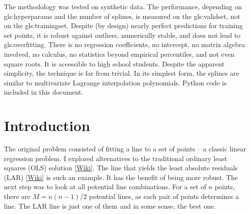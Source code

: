 \documentclass[oneside,10pt]{book}
\begin{document}
The methodology was tested on synthetic data. The performance, depending on \glspl{gls:hyperparam} and the number of splines, is measured on the \gls{gls:validset}, not on the \gls{gls:trainingset}. Despite (by design) nearly perfect predictions for training set points, it is robust against outliers, numerically stable, and does not lead to \gls{gls:overfitting}. There is no regression coefficients, no intercept, no matrix algebra involved, no calculus, no statistics beyond empirical percentiles, and not even square roots. It is accessible to high school students. Despite the apparent simplicity, the technique is far from trivial. In its simplest form, the splines are similar to multivariate Lagrange interpolation polynomials. Python code is included in this document.


\hypersetup{linkcolor=red}

\section{Introduction}\label{fregi1}


The original problem consisted of fitting a line to a set of points -- a classic linear regression problem. I explored alternatives to the traditional \textcolor{index}{ordinary least squares} (OLS)
solution [\href{https://en.wikipedia.org/wiki/Ordinary_least_squares}{Wiki}]. The line that yields the \textcolor{index}{least absolute residuals} (LAR) [\href{https://en.wikipedia.org/wiki/Least_absolute_deviations}{Wiki}] is such an example. It has the benefit of being more robust. The next step was to look at all potential line combinations. For a set of $n$ points, there are $M=n(n-1)/2$ potential lines, as each pair of points determines a line. The LAR line is just one of them and in some sense, the best one.
\end{document}
